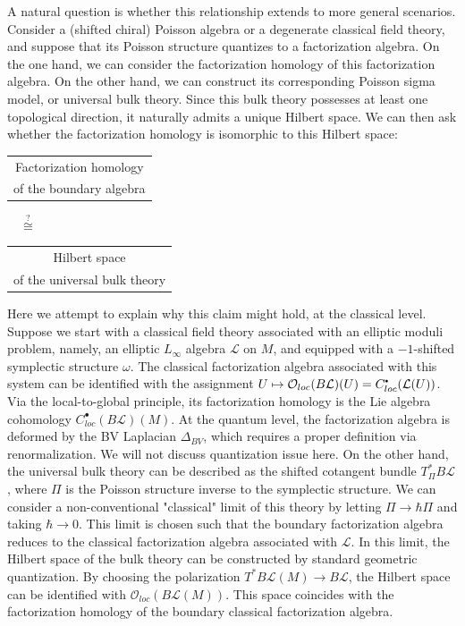 \documentclass[11pt]{article}
\newcommand\sbullet[1][.5]{\mathbin{\vcenter{\hbox{\scalebox{#1}{$\bullet$}}}}}
\numberwithin{equation}{section}
\begin{document}
A natural question is whether this relationship extends to more general scenarios. Consider a (shifted chiral) Poisson algebra or a degenerate classical field theory, and suppose that its Poisson structure quantizes to a factorization algebra. On the one hand, we can consider the factorization homology of this factorization algebra. On the other hand, we can construct its corresponding Poisson sigma model, or universal bulk theory. Since this bulk theory possesses at least one topological direction, it naturally admits a unique Hilbert space. We can then ask whether the factorization homology is isomorphic to this Hilbert space:
\begin{center}
	\begin{tabular}{c} Factorization homology \\ of the boundary algebra \end{tabular} $\quad\overset{?}{\cong}\quad $ \begin{tabular}{c} Hilbert space \\of the universal bulk theory \end{tabular}
\end{center}

Here we attempt to explain why this claim might hold, at the classical level. Suppose we start with a classical field theory associated with an elliptic moduli problem, namely, an elliptic $L_\infty$ algebra $\mathcal{L}$ on $M$, and equipped with a $-1$-shifted symplectic structure $\omega$. The classical factorization algebra associated with this system can be identified with the assignment $U \mapsto \mathcal{O}_{loc}(B\mathcal{L})(U) = C^{\sbullet}_{loc}(\mathcal{L}(U))$. Via the local-to-global principle, its factorization homology is the Lie algebra cohomology $C^{\bullet}_{loc}(B\mathcal{L})(M)$. At the quantum level, the factorization algebra is deformed by the BV Laplacian $\Delta_{BV}$, which requires a proper definition via renormalization. We will not discuss quantization issue here. On the other hand, the universal bulk theory can be described as the shifted cotangent bundle $T_{\Pi}^{*} B\mathcal{L}$, where $\Pi$ is the Poisson structure inverse to the symplectic structure. We can consider a non-conventional "classical" limit of this theory by letting $\Pi \to \hbar\Pi$ and taking $\hbar \to 0$. This limit is chosen such that the boundary factorization algebra reduces to the classical factorization algebra associated with $\mathcal{L}$. In this limit, the Hilbert space of the bulk theory can be constructed by standard geometric quantization. By choosing the polarization $T^*B\mathcal{L}(M) \to B\mathcal{L}$, the Hilbert space can be identified with $\mathcal{O}_{loc}(B\mathcal{L}(M))$. This space coincides with the factorization homology of the boundary classical factorization algebra.
\end{document}
